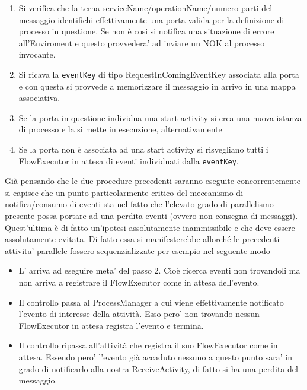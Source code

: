 \begin{enumerate}
  \item Si verifica che la terna serviceName/operationName/numero parti del
  messaggio identifichi effettivamente una porta valida per la definizione 
  di processo in questione. Se non \`e cosi si notifica una
  situazione di errore all'Enviroment e questo provvedera' ad inviare un NOK al
  processo invocante.
 
 \item Si ricava la \texttt{eventKey} di tipo RequestInComingEventKey associata
 alla porta e con questa si provvede a memorizzare il messaggio in arrivo in una mappa associativa.
 
 \item Se la porta in questione individua una start activity si crea una nuova
 istanza di processo e la si mette in esecuzione, alternativamente 
 
 \item Se la porta non \`e associata ad una start activity si risvegliano tutti
 i FlowExecutor in attesa di eventi individuati dalla \texttt{eventKey}.
\end{enumerate}

Già pensando che le due procedure precedenti saranno eseguite concorrentemente
si capisce che un punto particolarmente critico del meccanismo di
notifica/consumo di eventi sta nel fatto che l'elevato grado di parallelismo
presente possa portare ad una perdita eventi (ovvero non consegna di messaggi).
Quest'ultima \`e di fatto un'ipotesi assolutamente inammissibile e che deve
essere assolutamente evitata. Di fatto essa si manifesterebbe allorché le precedenti
attivita' parallele fossero sequenzializzate per esempio nel seguente modo

\begin{itemize}
  \item L' arriva ad eseguire meta' del passo 2. Cioè
  ricerca eventi non trovandoli ma non arriva a registrare il FlowExecutor come
  in attesa dell'evento.
  \item Il controllo passa al ProcessManager a cui viene effettivamente
  notificato l'evento di interesse della attività. Esso pero' non trovando
  nessun FlowExecutor in attesa registra l'evento e termina.
  \item Il controllo ripassa all'attività che registra il suo FlowExecutor come
  in attesa. Essendo pero' l'evento già accaduto nessuno a questo punto sara'
  in grado di notificarlo alla nostra ReceiveActivity, di fatto si ha una
  perdita del messaggio.
\end{itemize}

